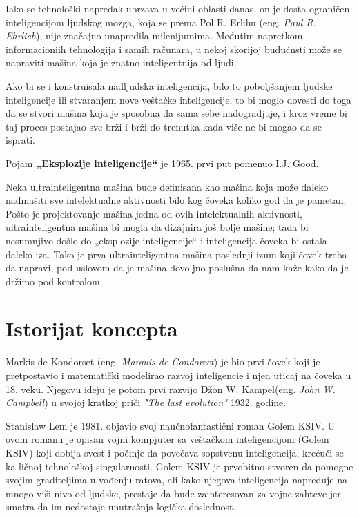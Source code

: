 \documentclass[a4paper]{article}
\begin{document}
Iako se tehnološki napredak ubrzava u većini oblasti danas, on je dosta ograničen inteligencijom ljudskog mozga, koja se prema Pol R. Erlihu (eng. \textit{Paul R. Ehrlich}), nije značajno unapredila milenijumima\cite{ref1}. Međutim napretkom informacioniih tehnologija i samih računara, u nekoj skorijoj budućnsti može se napraviti mašina koja je znatno inteligentnija od ljudi.

Ako bi se i konstruisala nadljudska inteligencija, bilo to poboljšanjem ljudske inteligencije ili stvaranjem nove veštačke inteligencije, to bi moglo dovesti do toga da se stvori mašina koja je sposobna da sama sebe nadogradjuje, i kroz vreme bi taj proces postajao sve brži i brži do trenutka kada više ne bi mogao da se isprati.

Pojam \textbf{„Eksplozije inteligencije“} je 1965. prvi put pomenuo I.J. Good\cite{ref2}.

Neka ultrainteligentna mašina bude definisana kao mašina koja može daleko nadmašiti sve intelektualne aktivnosti bilo kog čoveka koliko god da je pametan. Pošto je projektovanje mašina jedna od ovih intelektualnih aktivnosti, ultrainteligentna mašina bi mogla da dizajnira još bolje mašine; tada bi nesumnjivo došlo do „eksplozije inteligencije“ i inteligencija čoveka bi ostala daleko iza. Tako je prva ultrainteligentna mašina poslednji izum koji čovek treba da napravi, pod uslovom da je mašina dovoljno poslušna da nam kaže kako da je držimo pod kontrolom. 

\section{Istorijat koncepta}
\label{sec:istorijat}

Markis de Kondorset (eng. \textit{Marquis de Condorcet}) je bio prvi čovek koji je pretpostavio i matematički modelirao razvoj inteligencie i njen uticaj na čoveka u 18. veku. Njegovu ideju je potom prvi razvijo Džon W. Kampel(eng. \textit{John W. Campbell}) u svojoj kratkoj priči\textit{ "The last evolution"} 1932. godine\cite{ref3}.

Stanislaw Lem je 1981. objavio svoj naučnofantastični roman Golem KSIV. U ovom romanu je opisan vojni kompjuter sa veštačkom inteligencijom (Golem KSIV) koji dobija svest i počinje da povećava sopstvenu inteligencija, krećuči se ka ličnoj tehnološkoj singularnosti\cite{ref4}. Golem KSIV je prvobitno stvoren da pomogne svojim graditeljima u vođenju ratova, ali kako njegova inteligencija napreduje na mnogo viši nivo od ljudske, prestaje da bude zainteresovan za vojne zahteve jer smatra da im nedostaje unutrašnja logička doslednost\cite{ref5}.
\end{document}
